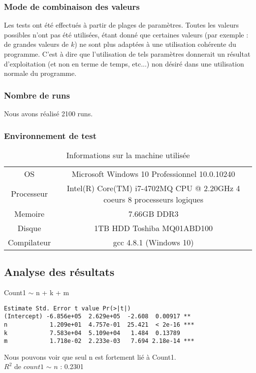\subsubsection{Mode de combinaison des valeurs}
Les tests ont été effectués à partir de plages de paramètres. Toutes les valeurs possibles n'ont pas été utilisées, étant donné que certaines valeurs (par exemple : de grandes valeurs de $k$) ne sont plus adaptées à une utilisation cohérente du programme. C'est à dire que l'utilisation de tels paramètres donnerait un résultat d'exploitation (et non en terme de temps, etc...) non désiré dans une utilisation normale du programme.

\subsubsection{Nombre de runs}
Nous avons réalisé 2100 runs.

\subsubsection{Environnement de test}
\begin{table}[h!]
	\centering
	\caption{Informations sur la machine utilisée}
	\label{tab:environnementExperience}
	\begin{tabular}{c|c}
		\toprule
		OS & Microsoft Windows 10 Professionnel 10.0.10240\\
		Processeur & Intel(R) Core(TM) i7-4702MQ CPU @ 2.20GHz 4 coeurs 8 processeurs logiques\\
		Memoire & 7.66GB DDR3\\
		Disque & 1TB HDD Toshiba MQ01ABD100\\
		Compilateur & gcc 4.8.1 (Windows 10)\\
		\bottomrule
	\end{tabular}
\end{table}


\subsection{Analyse des résultats}


Count1 $\sim$ n + k + m
\begin{verbatim}
Estimate Std. Error t value Pr(>|t|)    
(Intercept) -6.856e+05  2.629e+05  -2.608  0.00917 ** 
n            1.209e+01  4.757e-01  25.421  < 2e-16 ***
k            7.583e+04  5.109e+04   1.484  0.13789    
m            1.718e-02  2.233e-03   7.694 2.18e-14 ***
\end{verbatim}
Nous pouvons voir que seul n est fortement lié à Count1.\\
$R^2$ de $count1$ $\sim$ $n$ : 0.2301\\


